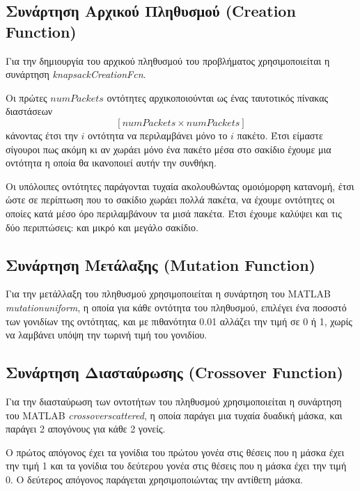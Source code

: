 \documentclass{article}
\begin{document}
\subsection{Συνάρτηση Αρχικού Πληθυσμού (Creation Function)}

Για την δημιουργία του αρχικού πληθυσμού του προβλήματος χρησιμοποιείται η
συνάρτηση \textit{knapsackCreationFcn}.

Οι πρώτες $\textit{numPackets}$ οντότητες αρχικοποιούνται ως ένας ταυτοτικός
πίνακας διαστάσεων
\begin{equation*}
\left[\textit{numPackets} \times \textit{numPackets}\right]
\end{equation*}
κάνοντας έτσι την $i$ οντότητα να περιλαμβάνει μόνο το $i$ πακέτο. Έτσι είμαστε
σίγουροι πως ακόμη κι αν χωράει μόνο ένα πακέτο μέσα στο σακίδιο έχουμε μια
οντότητα η οποία θα ικανοποιεί αυτήν την συνθήκη.

Οι υπόλοιπες οντότητες παράγονται τυχαία ακολουθώντας ομοιόμορφη κατανομή, έτσι
ώστε σε περίπτωση που το σακίδιο χωράει πολλά πακέτα, να έχουμε οντότητες οι
οποίες κατά μέσο όρο περιλαμβάνουν τα μισά πακέτα. Έτσι έχουμε καλύψει και τις
δύο περιπτώσεις: και μικρό και μεγάλο σακίδιο.

\subsection{Συνάρτηση Μετάλαξης (Mutation Function)}

Για την μετάλλαξη του πληθυσμού χρησιμοποιείται η συνάρτηση του MATLAB
\textit{mutationuniform}, η οποία για κάθε οντότητα του πληθυσμού, επιλέγει ένα
ποσοστό των γονιδίων της οντότητας, και με πιθανότητα 0.01 αλλάζει την τιμή σε 0
ή 1, χωρίς να λαμβάνει υπόψη την τωρινή τιμή του γονιδίου.

\subsection{Συνάρτηση Διασταύρωσης (Crossover Function)}

Για την διασταύρωση των οντοτήτων του πληθυσμού χρησιμοποιείται η συνάρτηση του
MATLAB \textit{crossoverscattered}, η οποία παράγει μια τυχαία δυαδική μάσκα,
και παράγει 2 απογόνους για κάθε 2 γονείς.

Ο πρώτος απόγονος έχει τα γονίδια του πρώτου γονέα στις θέσεις που η μάσκα έχει
την τιμή 1 και τα γονίδια του δεύτερου γονέα στις θέσεις που η μάσκα έχει την
τιμή 0. Ο δεύτερος απόγονος παράγεται χρησιμοποιώντας την αντίθετη μάσκα.
\end{document}
